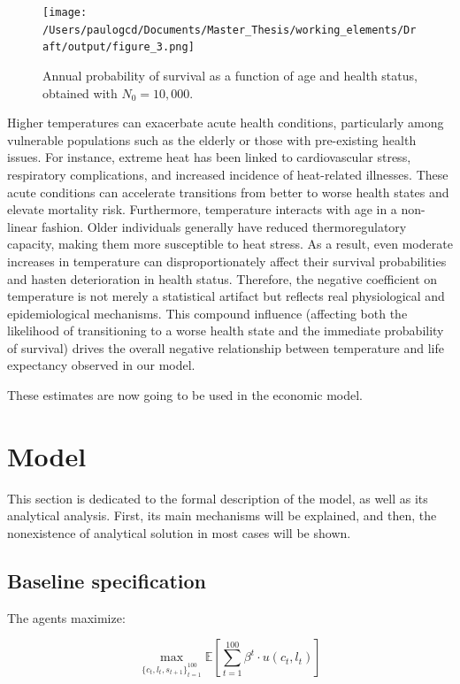 \documentclass{article}
\begin{document}
\begin{figure}[H]
    \centering
    \texttt{[image: /Users/paulogcd/Documents/Master\_Thesis/working\_elements/Draft/output/figure\_3.png]}
    \caption{Annual probability of survival as a function of age and health status, obtained with \( N_0 = 10{,}000 \).}
    \label{survival_probability}
\end{figure}

Higher temperatures can exacerbate acute health conditions, particularly among vulnerable populations such as the elderly or those with pre-existing health issues.
For instance, extreme heat has been linked to cardiovascular stress, respiratory complications, and increased incidence of heat-related illnesses.
These acute conditions can accelerate transitions from better to worse health states and elevate mortality risk.
Furthermore, temperature interacts with age in a non-linear fashion. Older individuals generally have reduced thermoregulatory capacity, making them more susceptible to heat stress.
As a result, even moderate increases in temperature can disproportionately affect their survival probabilities and hasten deterioration in health status.
Therefore, the negative coefficient on temperature is not merely a statistical artifact but reflects real physiological and epidemiological mechanisms.
This compound influence (affecting both the likelihood of transitioning to a worse health state and the immediate probability of survival) drives the overall negative relationship between temperature and life expectancy observed in our model.

These estimates are now going to be used in 
the economic model.

\section{Model}

This section is dedicated to the formal description of 
the model, as well as its analytical analysis.
First, its main mechanisms will be explained, and then, the 
nonexistence of analytical solution in most cases will be shown.

\subsection{Baseline specification }

The agents maximize: 

$$ \max_{\{c_{t},l_{t},s_{t+1}\}_{t=1}^{100}}{\mathbb{E}\left[\sum_{t=1}^{100} \beta^{t}\cdot u(c_t,l_t)\right]}$$
\end{document}
